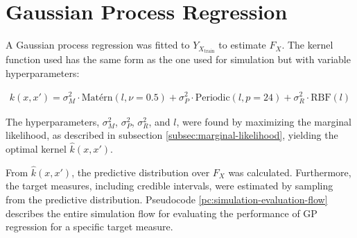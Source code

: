 \section{Gaussian Process Regression}\label{sec:evaluation-gaussian-process-regression}

A Gaussian process regression was fitted to $Y_{X_{\text{train}}}$ to estimate $F_X$.
The kernel function used has the same form as the one used for simulation
but with variable hyperparameters:

\begin{gather*}\label{def:gp_fit}
    k(x, x') = \sigma_M^2 \cdot \text{Matérn}(l, \nu=0.5) +
               \sigma_P^2 \cdot \text{Periodic}(l, p=24) +
               \sigma_R^2 \cdot \text{RBF}(l)
\end{gather*}

The hyperparameters, $\sigma_M^2$, $\sigma_P^2$, $\sigma_R^2$, and $l$, were found by
maximizing the marginal likelihood, as described in subsection
\ref{subsec:marginal-likelihood}, yielding the optimal kernel $\hat{k}(x, x')$.

From $\hat{k}(x, x')$, the predictive distribution over $F_X$ was calculated.
Furthermore, the target measures, including credible intervals, were estimated by
sampling from the predictive distribution.
Pseudocode \ref{pc:simulation-evaluation-flow} describes the entire simulation flow
for evaluating the performance of GP regression for a specific target measure.


